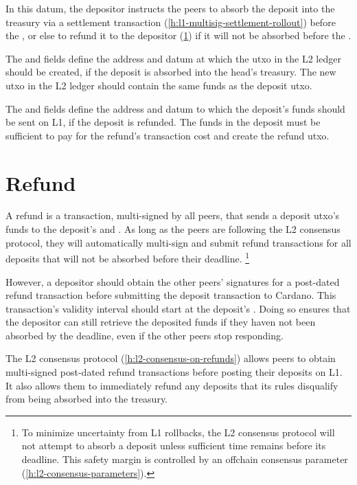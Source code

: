 \documentclass[../hydrozoa.tex]{subfiles}
\begin{document}
In this datum, the depositor instructs the peers to absorb the deposit into the treasury via a settlement transaction (\cref{h:l1-multisig-settlement-rollout}) before the , or else to refund it to the depositor (\cref{h:l1-multisig-refund}) if it will not be absorbed before the .

The  and  fields define the address and datum at which the utxo in the L2 ledger should be created, if the deposit is absorbed into the head's treasury.
The new utxo in the L2 ledger should contain the same funds as the deposit utxo.

The  and  fields define the address and datum to which the deposit's funds should be sent on L1, if the deposit is refunded.
The funds in the deposit must be sufficient to pay for the refund's transaction cost and create the refund utxo.

\section{Refund}%
\label{h:l1-multisig-refund}%

A refund is a transaction, multi-signed by all peers, that sends a deposit utxo's funds to the deposit's  and .
As long as the peers are following the L2 consensus protocol, they will automatically multi-sign and submit refund transactions for all deposits that will not be absorbed before their deadline.%
\footnote{To minimize uncertainty from L1 rollbacks, the L2 consensus protocol will not attempt to absorb a deposit unless sufficient time remains before its deadline. This safety margin is controlled by an offchain consensus parameter (\cref{h:l2-consensus-parameters}).}

However, a depositor should obtain the other peers' signatures for a post-dated refund transaction before submitting the deposit transaction to Cardano.
This transaction's validity interval should start at the deposit's .
Doing so ensures that the depositor can still retrieve the deposited funds if they haven not been absorbed by the deadline, even if the other peers stop responding.

The L2 consensus protocol (\cref{h:l2-consensus-on-refunds}) allows peers to obtain multi-signed post-dated refund transactions before posting their deposits on L1.
It also allows them to immediately refund any deposits that its rules disqualify from being absorbed into the treasury.
\end{document}
